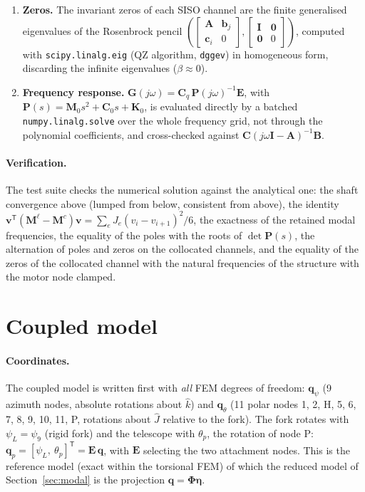\documentclass[10pt,a4paper]{article}
\numberwithin{equation}{section}
\begin{document}
\begin{enumerate}
\item \textbf{Zeros.} The invariant zeros of each SISO channel are the finite generalised eigenvalues of the Rosenbrock pencil $\left(\begin{bmatrix}\mathbf A & \mathbf b_j\\ \mathbf c_i & 0\end{bmatrix}, \begin{bmatrix}\mathbf I & \mathbf 0\\ \mathbf 0 & 0\end{bmatrix}\right)$, computed with \texttt{scipy.linalg.eig} (QZ algorithm, \texttt{dggev}) in homogeneous form, discarding the infinite eigenvalues ($\beta \approx 0$).
\item \textbf{Frequency response.} $\mathbf G(j\omega) = \mathbf C_q\,\mathbf P(j\omega)^{-1}\mathbf E$, with $\mathbf P(s) = \mathbf M_0 s^2 + \mathbf C_0 s + \mathbf K_0$, is evaluated directly by a batched \texttt{numpy.linalg.solve} over the whole frequency grid, not through the polynomial coefficients, and cross-checked against $\mathbf C(j\omega\mathbf I - \mathbf A)^{-1}\mathbf B$.
\end{enumerate}
\paragraph{Verification.} The test suite checks the numerical solution against the analytical one: the shaft convergence above (lumped from below, consistent from above), the identity $\mathbf v^{\mathsf T}(\mathbf M^{\ell} - \mathbf M^{c})\mathbf v = \sum_e J_e(v_i - v_{i+1})^2/6$, the exactness of the retained modal frequencies, the equality of the poles with the roots of $\det\mathbf P(s)$, the alternation of poles and zeros on the collocated channels, and the equality of the zeros of the collocated channel with the natural frequencies of the structure with the motor node clamped.
\section{Coupled model}\label{sec:coupled}
\paragraph{Coordinates.} The coupled model is written first with \emph{all} FEM degrees of freedom: $\mathbf q_\psi$ (9 azimuth nodes, absolute rotations about $\hat k$) and $\mathbf q_\theta$ (11 polar nodes 1, 2, H, 5, 6, 7, 8, 9, 10, 11, P, rotations about $\hat J$ relative to the fork). The fork rotates with $\psi_L = \psi_9$ (rigid fork) and the telescope with $\theta_p$, the rotation of node P: $\mathbf q_p = [\psi_L,\ \theta_p]^{\mathsf T} = \mathbf E\,\mathbf q$, with $\mathbf E$ selecting the two attachment nodes. This is the reference model (exact within the torsional FEM) of which the reduced model of Section~\ref{sec:modal} is the projection $\mathbf q = \boldsymbol\Phi\boldsymbol\eta$.
\end{document}
